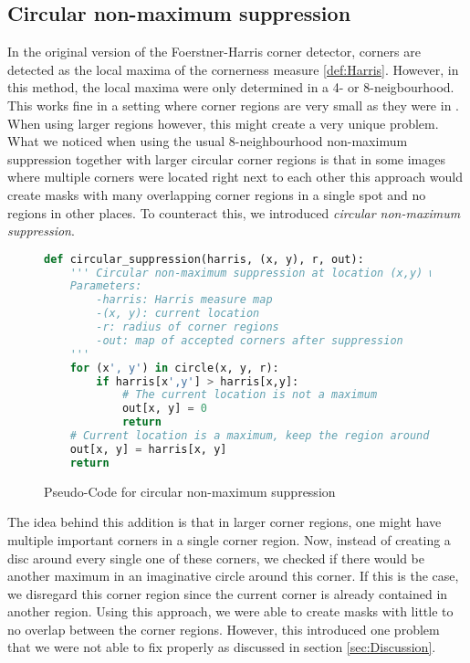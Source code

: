 \subsection{Circular non-maximum suppression}\label{sub:Suppression}
In the original version of the Foerstner-Harris corner detector, corners are detected as the local
maxima of the cornerness measure \eqref{def:Harris}. However, in this method, the local maxima were
only determined in a 4- or 8-neigbourhood. This works fine in a setting where corner regions are
very small as they were in \cite{zimmer07}. When using larger regions however, this might create a
very unique problem.\\
What we noticed when using the usual 8-neighbourhood non-maximum suppression together with larger
circular corner regions is that in some
images where multiple corners were located right next to each other this approach would create
masks with many overlapping corner regions in a single spot and no regions in other places. To
counteract this, we introduced \textit{circular non-maximum suppression}.\\
\begin{figure}
    \begin{lstlisting}[language=Python]
def circular_suppression(harris, (x, y), r, out):
    ''' Circular non-maximum suppression at location (x,y) with radius r.
    Parameters:
        -harris: Harris measure map
        -(x, y): current location
        -r: radius of corner regions
        -out: map of accepted corners after suppression
    '''
    for (x', y') in circle(x, y, r):
        if harris[x',y'] > harris[x,y]:
            # The current location is not a maximum
            out[x, y] = 0
            return
    # Current location is a maximum, keep the region around it
    out[x, y] = harris[x, y]
    return 
    \end{lstlisting}
    \caption{Pseudo-Code for circular non-maximum suppression}
\end{figure}
The idea behind this addition is that in larger corner regions, one might have multiple 
important corners in a single corner region.
Now, instead of creating a disc around every single one of these corners, we checked if there 
would be another maximum in an imaginative circle around this corner. 
If this is the case, we disregard this corner region since the current corner is already 
contained in another region.
Using this approach, we were able to create masks with little to no overlap between the
corner regions. However, this introduced one problem that we were not able to fix properly as
discussed in section \ref{sec:Discussion}.

